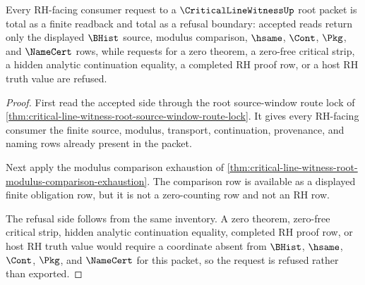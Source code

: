\begin{theorem}
\label{thm:critical-line-witness-root-rh-consumer-refusal-totality}
Every RH-facing consumer request to a $\CriticalLineWitnessUp$ root packet is total as a finite readback and total as a refusal boundary: accepted reads return only the displayed $\BHist$ source, modulus comparison, $\hsame$, $\Cont$, $\Pkg$, and $\NameCert$ rows, while requests for a zero theorem, a zero-free critical strip, a hidden analytic continuation equality, a completed RH proof row, or a host RH truth value are refused.
\end{theorem}
\begin{proof}
First read the accepted side through the root source-window route lock of \autoref{thm:critical-line-witness-root-source-window-route-lock}. It gives every RH-facing consumer the finite source, modulus, transport, continuation, provenance, and naming rows already present in the packet.

Next apply the modulus comparison exhaustion of \autoref{thm:critical-line-witness-root-modulus-comparison-exhaustion}. The comparison row is available as a displayed finite obligation row, but it is not a zero-counting row and not an RH row.

The refusal side follows from the same inventory. A zero theorem, zero-free critical strip, hidden analytic continuation equality, completed RH proof row, or host RH truth value would require a coordinate absent from $\BHist$, $\hsame$, $\Cont$, $\Pkg$, and $\NameCert$ for this packet, so the request is refused rather than exported.
\end{proof}

